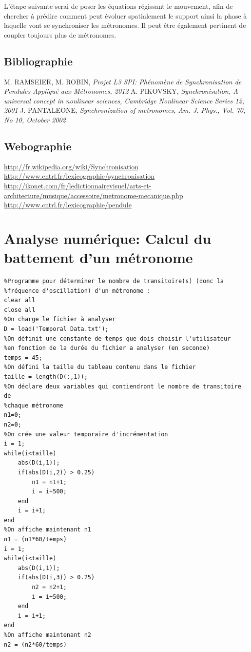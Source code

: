 \documentclass[a4paper,11pt]{report}
\begin{document}
L'étape suivante serai de poser les équations régissant le mouvement, afin de chercher à prédire comment peut évoluer spatialement le support ainsi la phase à laquelle vont se synchroniser les métronomes. Il peut être également pertinent de coupler toujours plus de métronomes.
\renewcommand{\bibname}{Références}
\begin{thebibliography}{2}
\section*{Bibliographie}
 M. RAMSEIER, M. ROBIN, {\it Projet L3 SPI: Phénomène de Synchronisation de Pendules Appliqué aux Métronomes, 2012}
 A. PIKOVSKY, {\it Synchronisation, A universal concept in nonlinear sciences, Cambridge Nonlinear Science Series 12, 2001}
 J. PANTALEONE, {\it Synchronization of metronomes, Am. J. Phys., Vol. 70, No 10, October 2002}
\section*{Webographie}
 \url{http://fr.wikipedia.org/wiki/Synchronisation}
 \url{http://www.cntrl.fr/lexicographie/synchronisation}
 \url{http://ikonet.com/fr/ledictionnairevisuel/arts-et-architecture/musique/accessoire/metronome-mecanique.php}
 \url{http://www.cntrl.fr/lexicographie/pendule}
\end{thebibliography}
\appendix
\chapter{Analyse numérique: Calcul du battement d'un métronome}
\label{Battements}
\begin{verbatim}
%Programme pour déterminer le nombre de transitoire(s) (donc la 
%fréquence d'oscillation) d'un métronome :
clear all
close all
%On charge le fichier à analyser
D = load('Temporal Data.txt');
%On définit une constante de temps que dois choisir l'utilisateur 
%en fonction de la durée du fichier a analyser (en seconde)
temps = 45;
%On défini la taille du tableau contenu dans le fichier
taille = length(D(:,1));
%On déclare deux variables qui contiendront le nombre de transitoire de
%chaque métronome
n1=0;
n2=0;
%On crée une valeur temporaire d'incrémentation
i = 1;
while(i<taille)
    abs(D(i,1));
    if(abs(D(i,2)) > 0.25)
        n1 = n1+1;
        i = i+500;
    end
    i = i+1;
end
%On affiche maintenant n1
n1 = (n1*60/temps)
i = 1;
while(i<taille)
    abs(D(i,1));
    if(abs(D(i,3)) > 0.25)
        n2 = n2+1;
        i = i+500;
    end
    i = i+1;
end
%On affiche maintenant n2
n2 = (n2*60/temps)
\end{verbatim}
\end{document}
